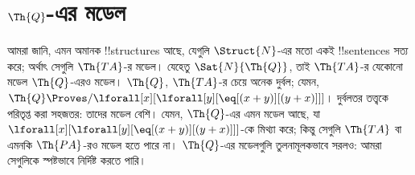 \documentclass[../../../include/open-logic-section]{subfiles}
\begin{document}
\section{$\Th{Q}$-এর মডেল}

\begin{explain}
আমরা জানি, এমন অমানক !!{structure}s আছে, যেগুলি $\Struct{N}$-এর মতো
একই !!{sentence}s সত্য করে; অর্থাৎ সেগুলি $\Th{TA}$-র মডেল। যেহেতু
$\Sat{N}{\Th{Q}}$, তাই $\Th{TA}$-র যেকোনো মডেল $\Th{Q}$-এরও মডেল।
$\Th{Q}$, $\Th{TA}$-র চেয়ে অনেক দুর্বল; যেমন,
$\Th{Q} \Proves/ \lforall[x][\lforall[y][\eq[(x +
      y)][(y+x)]]]$। দুর্বলতর তত্ত্বকে পরিতৃপ্ত করা সহজতর: তাদের মডেল
বেশি। যেমন, $\Th{Q}$-এর এমন মডেল আছে, যা
$\lforall[x][\lforall[y][\eq[(x + y)][(y+x)]]]$-কে মিথ্যা করে; কিন্তু
সেগুলি $\Th{TA}$ বা এমনকি $\Th{PA}$-রও মডেল হতে পারে না। $\Th{Q}$-এর
মডেলগুলি তুলনামূলকভাবে সরলও: আমরা সেগুলিকে স্পষ্টভাবে নির্দিষ্ট করতে
পারি।
\end{explain}
\end{document}
